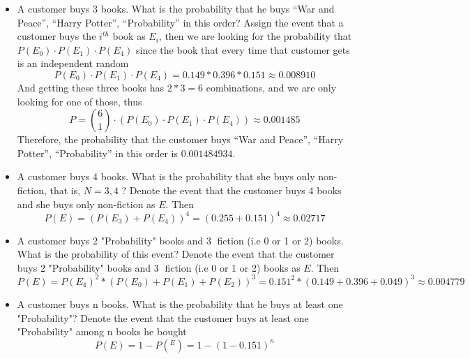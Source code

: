 \documentclass[preprint,12pt]{elsarticle}
\begin{document}
\begin{itemize}
    \item A customer buys 3 books. What is the probability that he buys “War and Peace”, “Harry Potter”, 
    “Probability” in this order?
    Assign the event that a customer buys the $i^{th}$ book as $E_i$, then we are looking for the probability
    that $P(E_0) \cdot P(E_1) \cdot P(E_4)$ since the book that every time that customer gets is an independent random
    \begin{equation*}
        P(E_0) \cdot P(E_1) \cdot P(E_4) = 0.149 * 0.396 * 0.151 \approx 0.008910
    \end{equation*}
    And getting these three books has $2 * 3 = 6$ combinations, and we are only looking for one of those, thus
    \begin{equation*}
        P = \binom{6}{1} \cdot (P(E_0) \cdot P(E_1) \cdot P(E_4)) \approx 0.001485
    \end{equation*}
    Therefore, the probability that the customer buys “War and Peace”, “Harry Potter”, “Probability” in this order
    is $0.001484934$.

    \item A customer buys 4 books. What is the probability that she buys only non-fiction, that is, $N={3, 4}$
    ?
    Denote the event that the customer buys 4 books and she buys only non-fiction as $E$. Then
    \begin{equation*}
        P(E) = (P(E_3) + P(E_4))^4 = (0.255 + 0.151)^4 \approx 0.02717
    \end{equation*}

    \item A customer buys 2 "Probability" books and 3 fiction (i.e 0 or 1 or 2) books. What is the probability
    of this event?
    Denote the event that the customer buys 2 "Probability" books and 3 fiction (i.e 0 or 1 or 2) books as $E$. Then
    \begin{equation*}
        P(E) = P(E_4)^2 * (P(E_0) + P(E_1) + P(E_2))^3 = 0.151^2 * (0.149 + 0.396 + 0.049)^3 \approx 0.004779
    \end{equation*}

    \item A customer buys n books. What is the probability that he buys at least one "Probability"?
    Denote the event that the customer buys at least one "Probability" among n books he bought
    \begin{equation*}
        P(E) = 1 - P(^E) = 1 - (1 - 0.151)^n
    \end{equation*}
    \end{itemize} 
\end{document}

